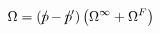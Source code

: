 \begin{equation}
\Omega=(p\hspace{-0.2
cm}/-p\hspace{-0.2cm}/')\left(\Omega^{\infty}+\Omega^{F}\right)
\end{equation}

